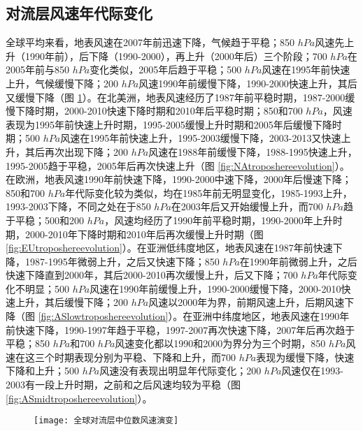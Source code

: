 \subsection{对流层风速年代际变化}

全球平均来看，地表风速在2007年前迅速下降，气候趋于平稳；850 $hPa$风速先上升（1990年前），后下降（1990-2000），再上升（2000年后）三个阶段；700 $hPa$在2005年前与850 $hPa$变化类似，2005年后趋于平稳；500 $hPa$风速在1995年前快速上升，气候缓慢下降；200 $hPa$风速1990年前缓慢下降，1990-2000快速上升，其后又缓慢下降（图 \ref{fig:globaltroposhereevolution}）。在北美洲，地表风速经历了1987年前平稳时期，1987-2000缓慢下降时期，2000-2010快速下降时期和2010年后平稳时期；850和700 $hPa$，风速表现为1995年前快速上升时期，1995-2005缓慢上升时期和2005年后缓慢下降时期；500 $hPa$风速在1995年前快速上升，1995-2003缓慢下降，2003-2013又快速上升，其后再次出现下降；200 $hPa$风速在1988年前缓慢下降，1988-1995快速上升，1995-2005趋于平稳，2005年后再次快速上升（图 \ref{fig:NAtroposhereevolution}）。在欧洲，地表风速1990年前快速下降，1990-2000中速下降，2000年后慢速下降；850和700 $hPa$年代际变化较为类似，均在1985年前无明显变化，1985-1993上升，1993-2003下降，不同之处在于850 $hPa$在2003年后又开始缓慢上升，而700 $hPa$趋于平稳；500和200 $hPa$，风速均经历了1990年前平稳时期，1990-2000年上升时期，2000-2010年下降时期和2010年后再次缓慢上升时期（图 \ref{fig:EUtroposhereevolution}）。在亚洲低纬度地区，地表风速在1987年前快速下降，1987-1995年微弱上升，之后又快速下降；850 $hPa$在1990年前微弱上升，之后快速下降直到2000年，其后2000-2010再次缓慢上升，后又下降；700 $hPa$年代际变化不明显；500 $hPa$风速在1990年前缓慢上升，1990-2000缓慢下降，2000-2010快速上升，其后缓慢下降；200 $hPa$风速以2000年为界，前期风速上升，后期风速下降（图 \ref{fig:ASlowtroposhereevolution}）。在亚洲中纬度地区，地表风速在1990年前快速下降，1990-1997年趋于平稳，1997-2007再次快速下降，2007年后再次趋于平稳；850 $hPa$和700 $hPa$风速变化都以1990和2000为界分为三个时期，850 $hPa$风速在这三个时期表现分别为平稳、下降和上升，而700 $hPa$表现为缓慢下降，快速下降和上升；500 $hPa$风速没有表现出明显年代际变化；200 $hPa$风速仅在1993-2003有一段上升时期，之前和之后风速均较为平稳（图 \ref{fig:ASmidtroposhereevolution}）。

\begin{figure}[!htbp]
    \centering
    \texttt{[image: 全球对流层中位数风速演变]}
    \label{fig:globaltroposhereevolution}
\end{figure}

